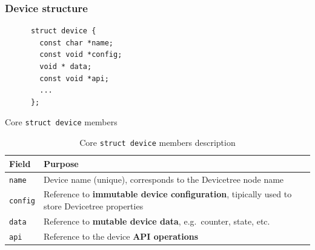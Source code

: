 \documentclass[handout]{beamer}
\begin{document}
\begin{frame}[fragile]
  \frametitle{Device structure}

  \begin{listing}[H]
    \begin{verbatim}
      struct device {
        const char *name;
        const void *config;
        void * data;
        const void *api;
        ...
      };
    \end{verbatim}
    \caption{Core \texttt{struct device} members}
  \end{listing}

  \begin{table}
    \centering
    \footnotesize
    \begin{tabular}{lp{}}
      \toprule
      Field           & Purpose                                            \\
      \midrule
      \texttt{name}   &                                                    %
      Device name (unique), corresponds to the Devicetree node name        \\
      \texttt{config} &                                                    %
      Reference to \textbf{immutable device configuration}, tipically used to
      store Devicetree properties                                          \\
      \texttt{data}   &                                                    %
      Reference to \textbf{mutable device data}, e.g.\ counter, state, etc.\\
      \texttt{api}    &                                                    %
      Reference to the device \textbf{API operations}                      \\
      \bottomrule
    \end{tabular}
    \caption{Core \texttt{struct device} members description}
  \end{table}
\end{frame}
\end{document}
